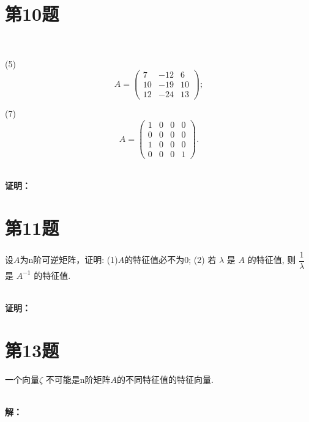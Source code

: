 \documentclass[a4paper, 12pt]{ctexart}
\begin{document}
 

\section{第10题}~\\

\begin{exercise}
(5) \[
{A}=\left(\begin{array}{ccc}
7 & -12 & 6 \\
10 & -19 & 10 \\
12 & -24 & 13
\end{array}\right);
\]

(7) \[
{A}=\left(\begin{array}{cccc}
1 & 0 & 0 & 0 \\
0 & 0 & 0 & 0 \\
1 & 0 & 0 & 0 \\
0 & 0 & 0 & 1
\end{array}\right).
\]
\end{exercise}~\\

\noindent\textbf{证明：}


\section{第11题}
\begin{exercise}
设$A$为n阶可逆矩阵，证明:
(1)$A$的特征值必不为0;
(2) 若 $\lambda$ 是 $A$ 的特征值, 则 $\dfrac{1}{\lambda}$ 是 $A^{-1}$ 的特征值.
\end{exercise}~\\
\noindent\textbf{证明：}\\


\section{第13题}
\begin{exercise}
一个向量$\zeta$ 不可能是n阶矩阵$A$的不同特征值的特征向量.\\
\end{exercise}~\\
\noindent\textbf{解：}\\
\end{document}
